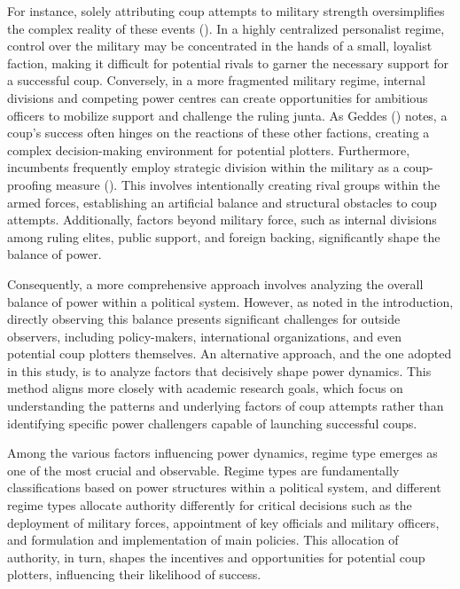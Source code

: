 \documentclass[
  12pt,
]{report}
\begin{document}
For instance, solely attributing coup attempts to military strength
oversimplifies the complex reality of these events
(). In a highly centralized
personalist regime, control over the military may be concentrated in the
hands of a small, loyalist faction, making it difficult for potential
rivals to garner the necessary support for a successful coup.
Conversely, in a more fragmented military regime, internal divisions and
competing power centres can create opportunities for ambitious officers
to mobilize support and challenge the ruling junta. As Geddes
() notes, a coup's success often hinges
on the reactions of these other factions, creating a complex
decision-making environment for potential plotters. Furthermore,
incumbents frequently employ strategic division within the military as a
coup-proofing measure (). This involves intentionally creating rival groups within the
armed forces, establishing an artificial balance and structural
obstacles to coup attempts. Additionally, factors beyond military force,
such as internal divisions among ruling elites, public support, and
foreign backing, significantly shape the balance of power.

Consequently, a more comprehensive approach involves analyzing the
overall balance of power within a political system. However, as noted in
the introduction, directly observing this balance presents significant
challenges for outside observers, including policy-makers, international
organizations, and even potential coup plotters themselves. An
alternative approach, and the one adopted in this study, is to analyze
factors that decisively shape power dynamics. This method aligns more
closely with academic research goals, which focus on understanding the
patterns and underlying factors of coup attempts rather than identifying
specific power challengers capable of launching successful coups.

Among the various factors influencing power dynamics, regime type
emerges as one of the most crucial and observable. Regime types are
fundamentally classifications based on power structures within a
political system, and different regime types allocate authority
differently for critical decisions such as the deployment of military
forces, appointment of key officials and military officers, and
formulation and implementation of main policies. This allocation of
authority, in turn, shapes the incentives and opportunities for
potential coup plotters, influencing their likelihood of success.
\end{document}
